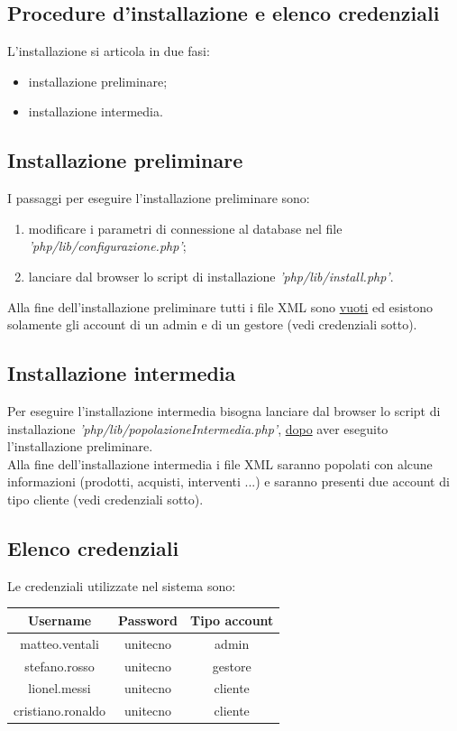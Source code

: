 \documentclass[a4paper, 14pt]{article}
\begin{document}
\begin{flushleft}
	\section{Procedure d'installazione e elenco credenziali}
		L'installazione si articola in due fasi:
		\begin{itemize}
			\item installazione preliminare;
			\item installazione intermedia.
		\end{itemize}
	
		\subsection{Installazione preliminare}
		I passaggi per eseguire l'installazione preliminare sono:
		\begin{enumerate}
			\item modificare i parametri di connessione al database nel file \textit{'php/lib/configurazione.php'};
			\item lanciare dal browser lo script di installazione \textit{'php/lib/install.php'}.
		\end{enumerate}
		Alla fine dell'installazione preliminare tutti i file XML sono \underline{vuoti} ed esistono solamente gli 
		account di un admin e di un gestore (vedi credenziali sotto).
		
		\subsection{Installazione intermedia}
		Per eseguire l'installazione intermedia bisogna lanciare dal browser lo script di installazione \textit{'php/lib/popolazioneIntermedia.php'}, \underline{dopo} aver eseguito l'installazione preliminare.\\
		Alla fine dell'installazione intermedia i file XML saranno popolati con alcune informazioni (prodotti, acquisti, interventi ...) e saranno presenti due account di tipo cliente (vedi credenziali sotto).
		
		\subsection{Elenco credenziali}
		Le credenziali utilizzate nel sistema sono: \\
		\begin{center}
		\begin{tabular}{ | c | c | c| }
			\hline
				\textbf{Username} & \textbf{Password}  & \textbf{Tipo account} \\
			\hline
				matteo.ventali & unitecno & admin \\
			\hline
				stefano.rosso & unitecno & gestore \\
			\hline
				lionel.messi & unitecno & cliente \\
			\hline
				cristiano.ronaldo & unitecno & cliente \\
			\hline
		\end{tabular}
		\end{center}
	\end{flushleft}
\end{document}
